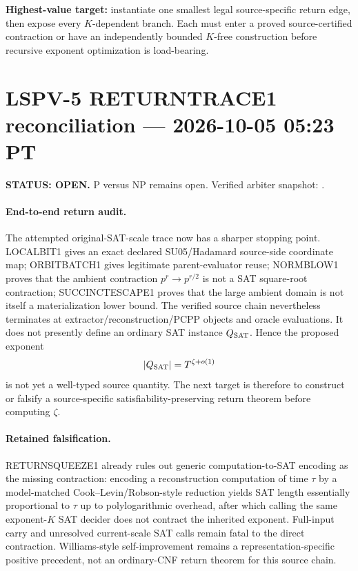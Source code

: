 \documentclass[11pt]{article}
\begin{document}
\textbf{Highest-value target:} instantiate one smallest legal source-specific return edge, then expose every \(K\)-dependent branch. Each must enter a proved source-certified contraction or have an independently bounded \(K\)-free construction before recursive exponent optimization is load-bearing.


\section{LSPV-5 RETURNTRACE1 reconciliation --- 2026-10-05 05:23 PT}
\textbf{STATUS: OPEN.} P versus NP remains open. Verified arbiter snapshot:
.

\paragraph{End-to-end return audit.}
The attempted original-SAT-scale trace now has a sharper stopping point. LOCALBIT1 gives an exact declared SU05/Hadamard source-side coordinate map; ORBITBATCH1 gives legitimate parent-evaluator reuse; NORMBLOW1 proves that the ambient contraction $p^r\to p^{r/2}$ is not a SAT square-root contraction; SUCCINCTESCAPE1 proves that the large ambient domain is not itself a materialization lower bound. The verified source chain nevertheless terminates at extractor/reconstruction/PCPP objects and oracle evaluations. It does not presently define an ordinary SAT instance $Q_{\rm SAT}$. Hence the proposed exponent
\[
|Q_{\rm SAT}|=T^{\zeta+o(1)}
\]
is not yet a well-typed source quantity. The next target is therefore to construct or falsify a source-specific satisfiability-preserving return theorem before computing $\zeta$.

\paragraph{Retained falsification.}
RETURNSQUEEZE1 already rules out generic computation-to-SAT encoding as the missing contraction: encoding a reconstruction computation of time $\tau$ by a model-matched Cook--Levin/Robson-style reduction yields SAT length essentially proportional to $\tau$ up to polylogarithmic overhead, after which calling the same exponent-$K$ SAT decider does not contract the inherited exponent. Full-input carry and unresolved current-scale SAT calls remain fatal to the direct contraction. Williams-style self-improvement remains a representation-specific positive precedent, not an ordinary-CNF return theorem for this source chain.
\end{document}
